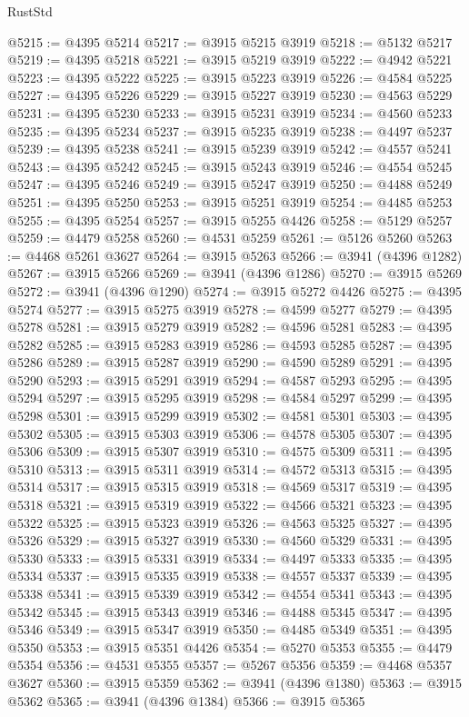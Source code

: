 \begin{lexlean}{RustStd}
\begin{coremodule}
@5215 := @4395 @5214
@5217 := @3915 @5215 @3919
@5218 := @5132 @5217
@5219 := @4395 @5218
@5221 := @3915 @5219 @3919
@5222 := @4942 @5221
@5223 := @4395 @5222
@5225 := @3915 @5223 @3919
@5226 := @4584 @5225
@5227 := @4395 @5226
@5229 := @3915 @5227 @3919
@5230 := @4563 @5229
@5231 := @4395 @5230
@5233 := @3915 @5231 @3919
@5234 := @4560 @5233
@5235 := @4395 @5234
@5237 := @3915 @5235 @3919
@5238 := @4497 @5237
@5239 := @4395 @5238
@5241 := @3915 @5239 @3919
@5242 := @4557 @5241
@5243 := @4395 @5242
@5245 := @3915 @5243 @3919
@5246 := @4554 @5245
@5247 := @4395 @5246
@5249 := @3915 @5247 @3919
@5250 := @4488 @5249
@5251 := @4395 @5250
@5253 := @3915 @5251 @3919
@5254 := @4485 @5253
@5255 := @4395 @5254
@5257 := @3915 @5255 @4426
@5258 := @5129 @5257
@5259 := @4479 @5258
@5260 := @4531 @5259
@5261 := @5126 @5260
@5263 := @4468 @5261 @3627
@5264 := @3915 @5263
@5266 := @3941 (@4396 @1282)
@5267 := @3915 @5266
@5269 := @3941 (@4396 @1286)
@5270 := @3915 @5269
@5272 := @3941 (@4396 @1290)
@5274 := @3915 @5272 @4426
@5275 := @4395 @5274
@5277 := @3915 @5275 @3919
@5278 := @4599 @5277
@5279 := @4395 @5278
@5281 := @3915 @5279 @3919
@5282 := @4596 @5281
@5283 := @4395 @5282
@5285 := @3915 @5283 @3919
@5286 := @4593 @5285
@5287 := @4395 @5286
@5289 := @3915 @5287 @3919
@5290 := @4590 @5289
@5291 := @4395 @5290
@5293 := @3915 @5291 @3919
@5294 := @4587 @5293
@5295 := @4395 @5294
@5297 := @3915 @5295 @3919
@5298 := @4584 @5297
@5299 := @4395 @5298
@5301 := @3915 @5299 @3919
@5302 := @4581 @5301
@5303 := @4395 @5302
@5305 := @3915 @5303 @3919
@5306 := @4578 @5305
@5307 := @4395 @5306
@5309 := @3915 @5307 @3919
@5310 := @4575 @5309
@5311 := @4395 @5310
@5313 := @3915 @5311 @3919
@5314 := @4572 @5313
@5315 := @4395 @5314
@5317 := @3915 @5315 @3919
@5318 := @4569 @5317
@5319 := @4395 @5318
@5321 := @3915 @5319 @3919
@5322 := @4566 @5321
@5323 := @4395 @5322
@5325 := @3915 @5323 @3919
@5326 := @4563 @5325
@5327 := @4395 @5326
@5329 := @3915 @5327 @3919
@5330 := @4560 @5329
@5331 := @4395 @5330
@5333 := @3915 @5331 @3919
@5334 := @4497 @5333
@5335 := @4395 @5334
@5337 := @3915 @5335 @3919
@5338 := @4557 @5337
@5339 := @4395 @5338
@5341 := @3915 @5339 @3919
@5342 := @4554 @5341
@5343 := @4395 @5342
@5345 := @3915 @5343 @3919
@5346 := @4488 @5345
@5347 := @4395 @5346
@5349 := @3915 @5347 @3919
@5350 := @4485 @5349
@5351 := @4395 @5350
@5353 := @3915 @5351 @4426
@5354 := @5270 @5353
@5355 := @4479 @5354
@5356 := @4531 @5355
@5357 := @5267 @5356
@5359 := @4468 @5357 @3627
@5360 := @3915 @5359
@5362 := @3941 (@4396 @1380)
@5363 := @3915 @5362
@5365 := @3941 (@4396 @1384)
@5366 := @3915 @5365

\end{coremodule}
\end{lexlean}
